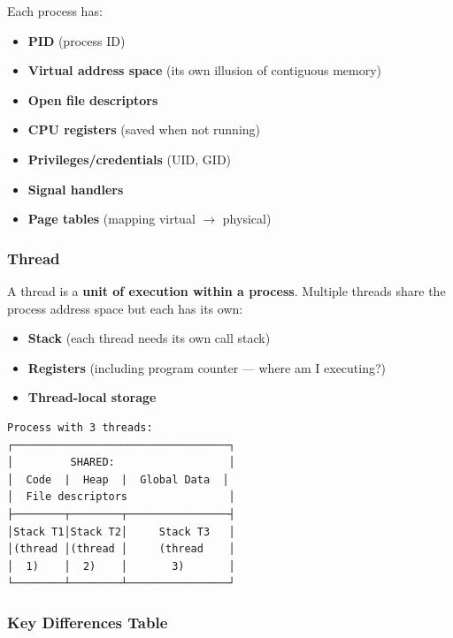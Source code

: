 \documentclass[11pt]{article}
\providecommand{\tightlist}{\setlength{\itemsep}{1pt}\setlength{\parskip}{0pt}}
\begin{document}
Each process has:

\begin{itemize}
\tightlist
\item
  \textbf{PID} (process ID)
\item
  \textbf{Virtual address space} (its own illusion of contiguous memory)
\item
  \textbf{Open file descriptors}
\item
  \textbf{CPU registers} (saved when not running)
\item
  \textbf{Privileges/credentials} (UID, GID)
\item
  \textbf{Signal handlers}
\item
  \textbf{Page tables} (mapping virtual \(\rightarrow\) physical)
\end{itemize}

\subsubsection{Thread}\label{thread}

A thread is a \textbf{unit of execution within a process}. Multiple threads share the process address space but each has its own:

\begin{itemize}
\tightlist
\item
  \textbf{Stack} (each thread needs its own call stack)
\item
  \textbf{Registers} (including program counter --- where am I executing?)
\item
  \textbf{Thread-local storage}
\end{itemize}

\setcodelang{}

\begin{verbatim}
Process with 3 threads:
┌──────────────────────────────────┐
│         SHARED:                  │
│  Code  |  Heap  |  Global Data  │
│  File descriptors                │
├────────┬────────┬────────────────┤
│Stack T1│Stack T2│     Stack T3   │
│(thread │(thread │     (thread    │
│  1)    │  2)    │       3)       │
└────────┴────────┴────────────────┘
\end{verbatim}

\subsubsection{Key Differences Table}\label{key-differences-table}
\end{document}
